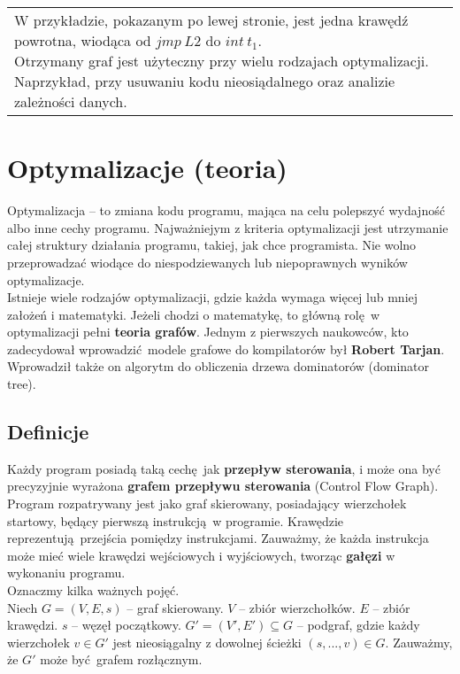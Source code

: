 \documentclass[leqno, 12pt]{article}
\begin{document}
\begin{center}
\begin{tabularx}{\textwidth}{ L{9cm} L{9cm} }
		W przykładzie, pokazanym po lewej stronie, jest jedna krawędź powrotna, wiodąca od $jmp \ L2$ do
		$int \ t_1$.
		$$$$ %
		Otrzymany graf jest użyteczny przy wielu rodzajach optymalizacji. Naprzykład, przy usuwaniu kodu nieosiądalnego
		oraz analizie zależności danych.

		\end{tabularx}
		\end{center}

	\section{Optymalizacje (teoria)}
		
		Optymalizacja -- to zmiana kodu programu, mająca na celu polepszyć wydajność albo inne cechy
		programu. Najważniejym z kriteria optymalizacji jest utrzymanie całej struktury działania programu,
		takiej, jak chce programista. Nie wolno przeprowadzać wiodące do niespodziewanych lub
		niepoprawnych wyników optymalizacje.
		\\
		
		Istnieje wiele rodzajów optymalizacji, gdzie każda wymaga więcej lub mniej założeń i
		matematyki. Jeżeli chodzi o matematykę, to główną rolę w optymalizacji pełni \textbf{teoria grafów}.
		Jednym z pierwszych naukowców, kto zadecydował wprowadzić modele grafowe do kompilatorów był
		\textbf{Robert Tarjan}. Wprowadził także on algorytm do obliczenia drzewa dominatorów (dominator tree).

		\subsection{Definicje}
			Każdy program posiadą taką cechę jak \textbf{przepływ sterowania}, i może ona być
			precyzyjnie wyrażona \textbf{grafem przepływu sterowania} (Control Flow Graph). Program
			rozpatrywany jest jako graf skierowany, posiadający wierzchołek startowy, będący pierwszą
			instrukcją w programie. Krawędzie reprezentują przejścia pomiędzy instrukcjami. Zauważmy,
			że każda instrukcja może mieć wiele krawędzi wejściowych i wyjściowych, tworząc \textbf{gałęzi}
			w wykonaniu programu.
			\\
			
			Oznaczmy kilka ważnych pojęć.
			\\

			Niech $G = (V, E, s)$ -- graf skierowany.
			$V$ -- zbiór wierzchołków. $E$ -- zbiór krawędzi. $s$ -- węzęł początkowy.
			$G' = (V', E') \subseteq G$ -- podgraf, gdzie każdy wierzchołek $v \in G'$ jest nieosiągalny z
			dowolnej ścieżki $(s, ...,  v) \in G$. Zauważmy, że $G'$ może być grafem rozłącznym.
\end{document}
